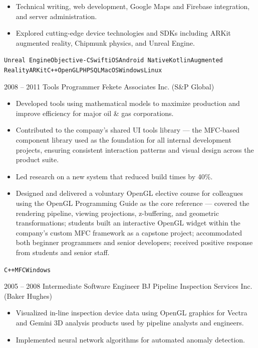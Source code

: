 \documentclass[9pt]{developercv}
\begin{document}
\begin{entrylist}
{\begin{itemize}[noitemsep,topsep=2pt,leftmargin=1em,parsep=0pt]
			  \item Technical writing, web development, Google Maps and Firebase integration, and server administration.
			  \item Explored cutting-edge device technologies and SDKs including ARKit augmented reality, Chipmunk physics, and Unreal Engine.
			\end{itemize}
			\texttt{Unreal Engine}\slashsep\texttt{Objective-C}\slashsep\texttt{Swift}\slashsep\texttt{iOS}\slashsep\texttt{Android Native}\slashsep\texttt{Kotlin}\slashsep\texttt{Augmented Reality}\slashsep\texttt{ARKit}\slashsep\texttt{C++}\slashsep\texttt{OpenGL}\slashsep\texttt{PHP}\slashsep\texttt{SQL}\slashsep\texttt{MacOS}\slashsep\texttt{Windows}\slashsep\texttt{Linux}}
	\entry
		{2008 -- 2011}
		{Tools Programmer}
		{Fekete Associates Inc. (S\&P Global)}
		{\begin{itemize}[noitemsep,topsep=2pt,leftmargin=1em,parsep=0pt]
			  \item Developed tools using mathematical models to maximize production and improve efficiency for major oil \& gas corporations.
			  \item Contributed to the company's shared UI tools library --- the MFC-based component library used as the foundation for all internal development projects, ensuring consistent interaction patterns and visual design across the product suite.
			  \item Led research on a new system that reduced build times by 40\%.
			  \item Designed and delivered a voluntary OpenGL elective course for colleagues using the OpenGL Programming Guide as the core reference --- covered the rendering pipeline, viewing projections, z-buffering, and geometric transformations; students built an interactive OpenGL widget within the company's custom MFC framework as a capstone project; accommodated both beginner programmers and senior developers; received positive response from students and senior staff.
			\end{itemize}
			\texttt{C++}\slashsep\texttt{MFC}\slashsep\texttt{Windows}}
	\entry
		{2005 -- 2008}
		{Intermediate Software Engineer}
		{BJ Pipeline Inspection Services Inc. (Baker Hughes)}
		{\begin{itemize}[noitemsep,topsep=2pt,leftmargin=1em,parsep=0pt]
			  \item Visualized in-line inspection device data using OpenGL graphics for Vectra and Gemini 3D analysis products used by pipeline analysts and engineers.
			  \item Implemented neural network algorithms for automated anomaly detection.

\end{itemize}}
\end{entrylist}
\end{document}
